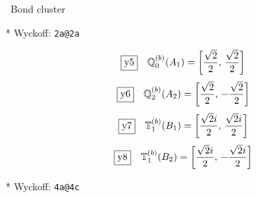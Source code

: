 \documentclass[fleqn,10pt,landscape]{jsarticle}
\begin{document}
\noindent\textbullet\, Bond cluster

\vspace{5mm}

\noindent ** Wyckoff: \texttt{2a@2a}

\begin{dmath*}
\fbox{y5}\quad \mathbb{Q}_{0}^{(b)}(A_{1})=\left[ \frac{\sqrt{2}}{2},\, \frac{\sqrt{2}}{2} \right]
\end{dmath*}
\begin{dmath*}
\fbox{y6}\quad \mathbb{Q}_{2}^{(b)}(A_{2})=\left[ \frac{\sqrt{2}}{2},\, - \frac{\sqrt{2}}{2} \right]
\end{dmath*}
\begin{dmath*}
\fbox{y7}\quad \mathbb{T}_{1}^{(b)}(B_{1})=\left[ \frac{\sqrt{2} i}{2},\, \frac{\sqrt{2} i}{2} \right]
\end{dmath*}
\begin{dmath*}
\fbox{y8}\quad \mathbb{T}_{1}^{(b)}(B_{2})=\left[ \frac{\sqrt{2} i}{2},\, - \frac{\sqrt{2} i}{2} \right]
\end{dmath*}
\vspace{5mm}

\noindent ** Wyckoff: \texttt{4a@4c}
\end{document}
